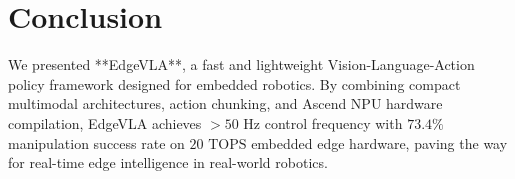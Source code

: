 \documentclass[lettersize,journal]{IEEEtran}
\begin{document}
\section{Conclusion}
We presented **EdgeVLA**, a fast and lightweight Vision-Language-Action policy framework designed for embedded robotics. By combining compact multimodal architectures, action chunking, and Ascend NPU hardware compilation, EdgeVLA achieves $>50\text{ Hz}$ control frequency with $73.4\%$ manipulation success rate on $20\text{ TOPS}$ embedded edge hardware, paving the way for real-time edge intelligence in real-world robotics.



\end{document}
